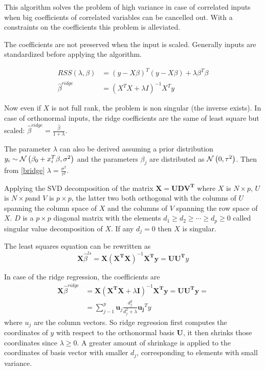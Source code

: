 \documentclass[12pt, letterpaper]{article}
\theoremstyle{definition}
\begin{document}
This algorithm solves the problem of high variance in case of correlated inputs when big coefficients of correlated variables can be cancelled out. With a constraints on the coefficients this problem is alleviated.

The coefficients are not preserved when the input is scaled. Generally inputs are standardized before applying the algorithm.

\begin{align}
RSS(\lambda, \beta)       &= \left( y - X \beta \right)^T \left( y - X\beta \right) + \lambda \beta^T \beta \\
\hat{\beta}^{ridge} &= \left( X^TX + \lambda I \right)^{-1} X^Ty
\end{align}

Now even if $X$ is not full rank, the problem is non singular (the inverse exists).
In case of orthonormal inputs, the ridge coefficients are the same of least square but scaled: $\hat{\beta}^{ridge}  = \frac{\hat{\beta}}{1+\lambda}$.

The parameter $\lambda$ can also be derived assuming a prior distribution $y_i  \sim  \CMcal{N}\left( \beta_0+x_i^T\beta, \sigma^2\right)$ and the parameters $\beta_j$ are distributed as $\CMcal{N}\left( 0, \tau^2\right)$. Then from \ref{bridge} $\lambda = \frac{\sigma^2}{\tau^2}$.

Applying the SVD decomposition of the matrix $\mathbf{X =  UDV^T}$ where $X$ is $N\times p$, $U$ is $N\times p$and $V$ is $p\times p$, the latter two both orthogonal with the columns of $U$ spanning the column space of $X$ and the columns of $V$ spanning the row space of $X$. $D$ is a $p\times p$ diagonal matrix with the elements $d_1\ge d_2 \ge \cdots \ge d_p\ge 0$ called singular value decomposition of $X$. If any $d_j = 0$ then $X$ is singular.

The least squares equation can be rewritten as 
\begin{equation}
\mathbf{X}\hat{\beta}^{ls}  = \mathbf{X\left( X^TX\right)}^{-1}\mathbf{X^Ty} = \mathbf{UU^T}y
\end{equation}

In case of the ridge regression, the coefficients are
\begin{equation}
\begin{aligned}
\mathbf{X}\hat{\beta}^{ridge}  &= \mathbf{X}\left( \mathbf{X^TX} +\lambda \mathbf{I} \right)^{-1}\mathbf{X^Ty} = \mathbf{UU^Ty} =\\
&= \sum_{j-1}^p \mathbf{u}_j \frac{d_j^2}{d_j^2+\lambda} \mathbf{u_j}^Ty
\end{aligned}
\end{equation}
where $u_j$ are the column vectors. So ridge regression first computes the coordinates of $y$ with respect to the orthonormal basis $\mathbf{U}$, it then shrinks those coordinates since $\lambda\ge0$. A greater amount of shrinkage is applied to the coordinates of basis vector with smaller $d_j$, corresponding to elements with small variance.
\end{document}
